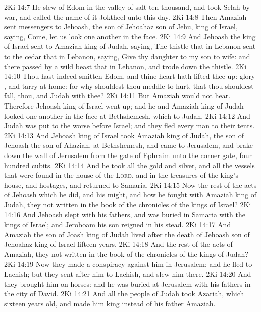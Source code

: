 \vs 2Ki 14:7 He slew of Edom in the valley of salt ten thousand, and took Selah by war, and called the name of it Joktheel unto this day.
\vs 2Ki 14:8 Then Amaziah sent messengers to Jehoash, the son of Jehoahaz son of Jehu, king of Israel, saying, Come, let us look one another in the face.
\vs 2Ki 14:9 And Jehoash the king of Israel sent to Amaziah king of Judah, saying, The thistle that  in Lebanon sent to the cedar that  in Lebanon, saying, Give thy daughter to my son to wife: and there passed by a wild beast that  in Lebanon, and trode down the thistle.
\vs 2Ki 14:10 Thou hast indeed smitten Edom, and thine heart hath lifted thee up: glory , and tarry at home: for why shouldest thou meddle to  hurt, that thou shouldest fall,  thou, and Judah with thee?
\vs 2Ki 14:11 But Amaziah would not hear. Therefore Jehoash king of Israel went up; and he and Amaziah king of Judah looked one another in the face at Bethshemesh, which  to Judah.
\vs 2Ki 14:12 And Judah was put to the worse before Israel; and they fled every man to their tents.
\vs 2Ki 14:13 And Jehoash king of Israel took Amaziah king of Judah, the son of Jehoash the son of Ahaziah, at Bethshemesh, and came to Jerusalem, and brake down the wall of Jerusalem from the gate of Ephraim unto the corner gate, four hundred cubits.
\vs 2Ki 14:14 And he took all the gold and silver, and all the vessels that were found in the house of the \textsc{Lord}, and in the treasures of the king's house, and hostages, and returned to Samaria.
\vs 2Ki 14:15 Now the rest of the acts of Jehoash which he did, and his might, and how he fought with Amaziah king of Judah,  they not written in the book of the chronicles of the kings of Israel?
\vs 2Ki 14:16 And Jehoash slept with his fathers, and was buried in Samaria with the kings of Israel; and Jeroboam his son reigned in his stead.
\vs 2Ki 14:17 And Amaziah the son of Joash king of Judah lived after the death of Jehoash son of Jehoahaz king of Israel fifteen years.
\vs 2Ki 14:18 And the rest of the acts of Amaziah,  they not written in the book of the chronicles of the kings of Judah?
\vs 2Ki 14:19 Now they made a conspiracy against him in Jerusalem: and he fled to Lachish; but they sent after him to Lachish, and slew him there.
\vs 2Ki 14:20 And they brought him on horses: and he was buried at Jerusalem with his fathers in the city of David.
\vs 2Ki 14:21 And all the people of Judah took Azariah, which  sixteen years old, and made him king instead of his father Amaziah.
